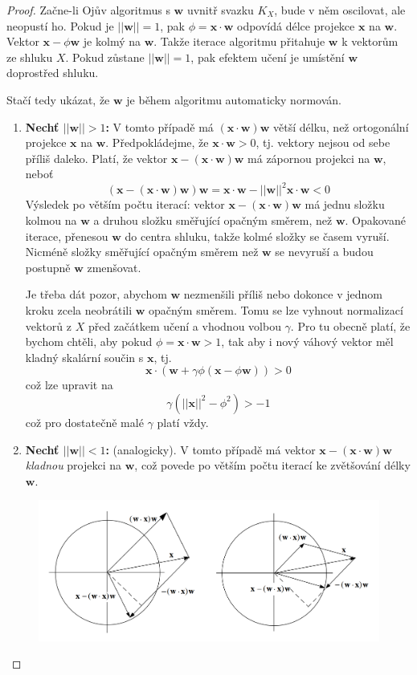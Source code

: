 \documentclass[11pt]{report} %
\renewcommand{\vec}[1]{\mathbf{#1}}
\numberwithin{equation}{section}
\begin{document}
\begin{proof}
Začne-li Ojův algoritmus s $\vec{w}$ uvnitř svazku $K_X$, bude v něm oscilovat, ale neopustí ho. Pokud je $||\vec{w}|| = 1$, pak $\phi = \vec{x}\cdot\vec{w}$ odpovídá délce projekce $\vec{x}$ na $\vec{w}$. Vektor $\vec{x} - \phi\vec{w}$ je kolmý na $\vec{w}$. Takže iterace algoritmu přitahuje $\vec{w}$ k vektorům ze shluku $X$. Pokud zůstane $||\vec{w}|| = 1$, pak efektem učení je umístění $\vec{w}$ doprostřed shluku.




Stačí tedy ukázat, že $\vec{w}$ je během algoritmu automaticky normován. 
\begin{enumerate}
	\item \textbf{Nechť $||\vec{w}|| > 1$:} V tomto případě má $(\vec{x}\cdot\vec{w})\vec{w}$ větší délku, než ortogonální projekce $\vec{x}$ na $\vec{w}$. Předpokládejme, že $\vec{x}\cdot\vec{w} > 0$, tj. vektory nejsou od sebe příliš daleko. Platí, že vektor $\vec{x} - (\vec{x}\cdot\vec{w})\vec{w}$ má zápornou projekci na $\vec{w}$, neboť
	 $$(\vec{x} - (\vec{x}\cdot\vec{w})\vec{w})\vec{w} = \vec{x}\cdot\vec{w} - ||\vec{w}||^2 \vec{x}\cdot\vec{w} < 0$$
	 Výsledek po větším počtu iterací: vektor $\vec{x} - (\vec{x}\cdot\vec{w})\vec{w}$ má jednu složku kolmou na $\vec{w}$ a druhou složku směřující opačným směrem, než $\vec{w}$. Opakované iterace, přenesou $\vec{w}$ do centra shluku, takže kolmé složky se časem vyruší. Nicméně složky směřující opačným směrem než $\vec{w}$ se nevyruší a budou postupně $\vec{w}$ zmenšovat.
	 
	 Je třeba dát pozor, abychom $\vec{w}$ nezmenšili příliš nebo dokonce v jednom kroku zcela neobrátili $\vec{w}$ opačným směrem. Tomu se lze vyhnout normalizací vektorů z $X$ před začátkem učení a vhodnou volbou $\gamma$. Pro tu obecně platí, že bychom chtěli, aby pokud $\phi = \vec{x}\cdot\vec{w} > 1$, tak aby i nový váhový vektor měl kladný skalární součin s $\vec{x}$, tj.
		$$\vec{x}\cdot(\vec{w} + \gamma\phi(\vec{x} - \phi\vec{w})) > 0$$
	což lze upravit na 
		$$\gamma(||\vec{x}||^2 - \phi^2) > -1$$
	což pro dostatečně malé $\gamma$ platí vždy.
	 
	\item \textbf{Nechť $||\vec{w}|| < 1$:} (analogicky). V tomto případě má vektor $\vec{x} - (\vec{x}\cdot\vec{w})\vec{w}$ \textit{kladnou} projekci na $\vec{w}$, což povede po větším počtu iterací ke zvětšování délky $\vec{w}$. 
\end{enumerate}

\begin{figure}[h]
	\centering
	\includegraphics[scale=0.7]{img/oja2.png}
\end{figure}



\end{proof}
\end{document}
